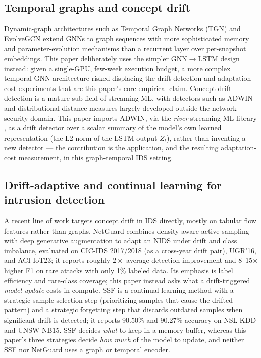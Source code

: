 \documentclass[twocolumn]{llncs}
\begin{document}
\subsection{Temporal graphs and concept drift}

Dynamic-graph architectures such as Temporal Graph Networks (TGN) \cite{rossi2020tgn} and
EvolveGCN \cite{pareja2020evolvegcn} extend GNNs to graph sequences with more sophisticated memory
and parameter-evolution mechanisms than a recurrent layer over per-snapshot embeddings. This paper
deliberately uses the simpler GNN$\rightarrow$LSTM \cite{hochreiter1997lstm} design instead: given
a single-GPU, few-week execution budget, a more complex temporal-GNN architecture risked displacing
the drift-detection and adaptation-cost experiments that are this paper's core empirical claim.
Concept-drift detection is a mature sub-field of streaming ML, with detectors such as ADWIN
\cite{bifet2007adwin} and distributional-distance measures \cite{gama2014survey} largely
developed outside the network-security domain. This paper imports ADWIN, via the \emph{river}
streaming ML library \cite{montiel2021river}, as a drift detector over a scalar summary of the
model's own learned representation (the L2 norm of the LSTM output $Z_t$), rather than inventing a
new detector --- the contribution is the application, and the resulting adaptation-cost
measurement, in this graph-temporal IDS setting.

\subsection{Drift-adaptive and continual learning for intrusion detection}

A recent line of work targets concept drift in IDS directly, mostly on tabular flow features rather
than graphs. NetGuard \cite{gupta2026netguard} combines density-aware active sampling with deep
generative augmentation to adapt an NIDS under drift and class imbalance, evaluated on CIC-IDS
2017/2018 (as a cross-year drift pair), UGR'16, and ACI-IoT23; it reports roughly $2\times$ average
detection improvement and 8--15$\times$ higher F1 on rare attacks with only 1\% labeled data. Its
emphasis is label efficiency and rare-class coverage; this paper instead asks what a drift-triggered
\emph{model update} costs in compute. SSF \cite{zhang2025ssf} is a continual-learning method with a
strategic sample-selection step (prioritizing samples that cause the drifted pattern) and a
strategic forgetting step that discards outdated samples when significant drift is detected; it
reports 90.50\% and 90.27\% accuracy on NSL-KDD and UNSW-NB15. SSF decides \emph{what} to keep in a
memory buffer, whereas this paper's three strategies decide \emph{how much} of the model to update,
and neither SSF nor NetGuard uses a graph or temporal encoder.
\end{document}
